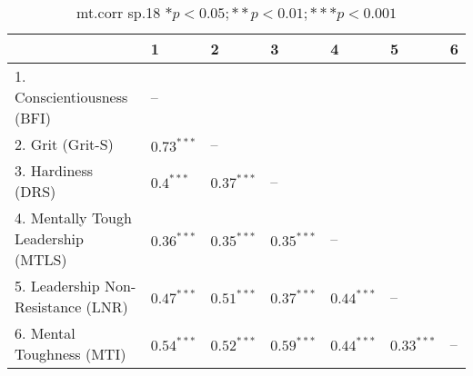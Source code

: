 \begin{table}[ht]
\centering
\begin{tabular}{lllllll}
  \hline
 & 1 & 2 & 3 & 4 & 5 & 6 \\ 
  \hline
1. Conscientiousness (BFI) & -- &  &  &  &  &  \\ 
  2. Grit (Grit-S) & $0.73^{***}$ & -- &  &  &  &  \\ 
  3. Hardiness (DRS) & $0.4^{***}$ & $0.37^{***}$ & -- &  &  &  \\ 
  4. Mentally Tough Leadership (MTLS) & $0.36^{***}$ & $0.35^{***}$ & $0.35^{***}$ & -- &  &  \\ 
  5. Leadership Non-Resistance (LNR) & $0.47^{***}$ & $0.51^{***}$ & $0.37^{***}$ & $0.44^{***}$ & -- &  \\ 
  6. Mental Toughness (MTI) & $0.54^{***}$ & $0.52^{***}$ & $0.59^{***}$ & $0.44^{***}$ & $0.33^{***}$ & -- \\ 
   \hline
\end{tabular}
\caption{mt.corr sp.18 $* p < 0.05; ** p < 0.01; *** p < 0.001$} 
\label{freq_corr.mt.corr.sp.18}
\end{table}
